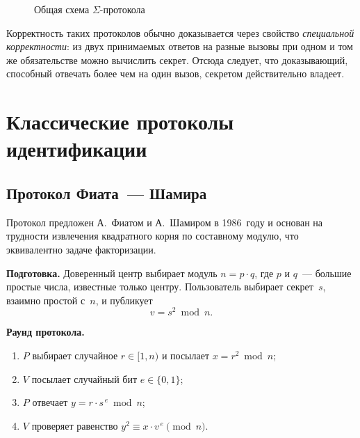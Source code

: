 \documentclass[14pt,a4paper]{extarticle}
\begin{document}
\begin{figure}[H]
\centering
{}
\caption{Общая схема $\Sigma$-протокола}
\label{fig:sigma}
\end{figure}

Корректность таких протоколов обычно доказывается через свойство \emph{специальной
корректности}: из двух принимаемых ответов на разные вызовы при одном и том же
обязательстве можно вычислить секрет. Отсюда следует, что доказывающий, способный
отвечать более чем на один вызов, секретом действительно владеет.

\section{Классические протоколы идентификации}

\subsection{Протокол Фиата~--- Шамира}

Протокол предложен А.~Фиатом и А.~Шамиром в 1986~году и основан на трудности извлечения
квадратного корня по составному модулю, что эквивалентно задаче факторизации.

\textbf{Подготовка.} Доверенный центр выбирает модуль $n = p \cdot q$, где $p$ и $q$~---
большие простые числа, известные только центру. Пользователь выбирает секрет~$s$,
взаимно простой с~$n$, и публикует
\begin{equation}
v = s^2 \bmod n.
\end{equation}

\textbf{Раунд протокола.}
\begin{enumerate}
\item $P$ выбирает случайное $r \in [1, n)$ и посылает $x = r^2 \bmod n$;
\item $V$ посылает случайный бит $e \in \{0, 1\}$;
\item $P$ отвечает $y = r \cdot s^{\,e} \bmod n$;
\item $V$ проверяет равенство $y^2 \equiv x \cdot v^{\,e} \pmod n$.
\end{enumerate}
\end{document}
